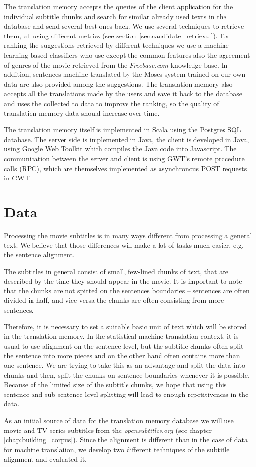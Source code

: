 The translation memory accepts the queries of the client application for the individual subtitle chunks and search for similar already used texts in the database and send several best ones back. We use several techniques to retrieve them, all using different metrics (see section \ref{sec:candidate_retrieval}). For ranking the suggestions retrieved by different techniques we use a machine learning based classifiers who use except the common features also the agreement of genres of the movie retrieved from the {\it Freebase.com} knowledge base. In addition, sentences machine translated by the Moses system trained on our own data are also provided among the suggestions. The translation memory also accepts all the translations made by the users and save it back to the database and uses the collected to data to improve the ranking, so the quality of translation memory data should increase over time.

The translation memory itself is implemented in Scala using the Postgres SQL database. The server side is implemented in Java, the client is developed in Java, using Google Web Toolkit which compiles the Java code into Javascript. The communication between the server and client is using GWT's remote procedure calls (RPC), which are themselves implemented as asynchronous POST requests in GWT.

\section{Data}

Processing the movie subtitles is in many ways different from processing a general text. We believe that those differences will make a lot of tasks much easier, e.g. the sentence alignment.

The subtitles in general consist of small, few-lined chunks of text, that are described by the time they should appear in the movie. It is important to note that the chunks are not spitted on the sentences boundaries -- sentences are often divided in half, and vice versa the chunks are often consisting from more sentences.    

Therefore, it is necessary to set a suitable basic unit of text which will be stored in the translation memory. In the statistical machine translation context, it is usual to use alignment on the sentence level, but the subtitle chunks often split the sentence into more pieces and on the other hand often contains more than one sentence. We are trying to take this as an advantage and split the data into chunks and then, split the chunks on sentence boundaries whenever it is possible. Because of the limited size of the subtitle chunks, we hope that using this sentence and sub-sentence level splitting will lead to enough repetitiveness in the data.

As an initial source of data for the translation memory database we will use movie and TV series subtitles from the {\it opensubtitles.org} (see chapter \ref{chap:building_corpus}). Since the alignment is different than in the case of data for machine translation, we develop two different techniques of the subtitle alignment and evaluated it.